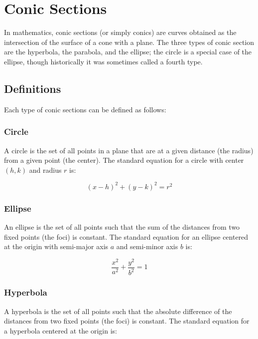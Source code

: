 \chapter{Conic Sections}

In mathematics, conic sections (or simply conics) are curves obtained as the intersection of the surface of a cone with a plane. The three types of conic section are the hyperbola, the parabola, and the ellipse; the circle is a special case of the ellipse, though historically it was sometimes called a fourth type.

\section{Definitions}

Each type of conic sections can be defined as follows:

\subsection{Circle}

A circle is the set of all points in a plane that are at a given distance (the radius) from a given point (the center). The standard equation for a circle with center $(h,k)$ and radius $r$ is:

\begin{equation}
(x - h)^2 + (y - k)^2 = r^2
\end{equation}

\subsection{Ellipse}

An ellipse is the set of all points such that the sum of the distances from two fixed points (the foci) is constant. The standard equation for an ellipse centered at the origin with semi-major axis $a$ and semi-minor axis $b$ is:

\begin{equation}
\frac{x^2}{a^2} + \frac{y^2}{b^2} = 1
\end{equation}

\subsection{Hyperbola}

A hyperbola is the set of all points such that the absolute difference of the distances from two fixed points (the foci) is constant. The standard equation for a hyperbola centered at the origin is:

